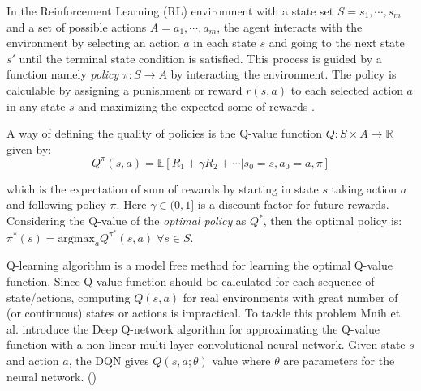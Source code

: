 In the Reinforcement Learning (RL) environment with a state set $S = s_1, \cdots, s_m$ and a  set of possible actions $A = a_1, \cdots, a_m$, the agent interacts with the environment by selecting an action $a$ in each state $s$ and going to the next state $s'$ until the terminal state condition is satisfied. This process is guided by a function namely \textit{policy} $\pi : S \longrightarrow A$ by interacting the environment. The policy is calculable by assigning a punishment or reward $r(s, a)$ to each selected action $a$ in any state $s$ and maximizing the expected some of rewards \cite{sutton1998}.  

A way of defining the quality of policies is the Q-value function $Q : S \times A \longrightarrow \mathbb{R}$ given by: 
$$Q^{\pi}(s, a) = \mathbb{E}[R_1+ \gamma R_2 + \cdots | s_0 = s, a_0 =a, \pi]$$

which is the expectation of sum of rewards by starting in state $s$ taking action $a$ and following policy $\pi$. Here $\gamma \in (0, 1]$ is a discount factor for future rewards. Considering the Q-value of the \textit{optimal policy} as $Q^*$, then the optimal policy is: $\pi^*(s) = \text{argmax}_a Q^{\pi^*}(s, a) \; \forall  s \in S$.  

Q-learning algorithm \cite{sutton1998} is a model free method for learning the optimal Q-value function. Since Q-value function should be calculated for each sequence of state/actions, computing $Q(s, a)$ for real environments with great number of (or continuous) states or actions  is impractical.  To tackle this problem Mnih et al.  introduce the Deep Q-network algorithm for approximating the Q-value function with a non-linear multi layer convolutional neural network.  Given state $s$ and action $a$, the DQN gives $Q(s, a; \theta)$ value where $\theta$ are parameters for the neural network. ()


